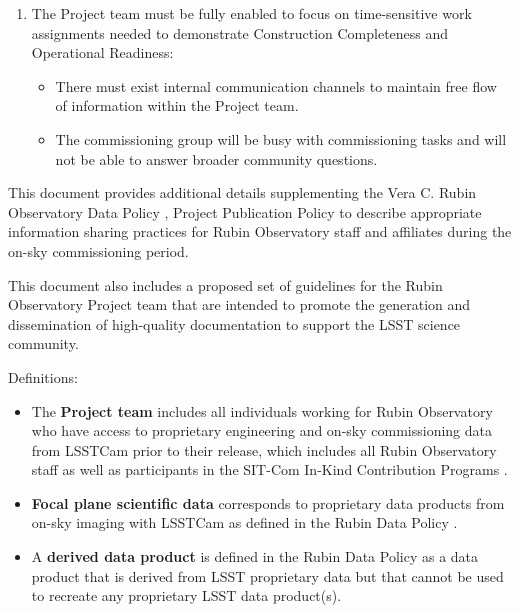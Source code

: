 \documentclass[SE,authoryear,toc,lsstdraft]{lsstdoc}
\begin{document}
\begin{enumerate}
  \item The Project team must be fully enabled to focus on time-sensitive work assignments needed to demonstrate Construction Completeness and Operational Readiness:

  \begin{itemize}

    \item There must exist internal communication channels to maintain free flow of information within the Project team.

    \item The commissioning group will be busy with commissioning tasks and will not be able to answer broader community questions.

  \end{itemize}

\end{enumerate}

This document provides additional details supplementing the Vera C. Rubin Observatory Data Policy , Project Publication Policy  to describe appropriate information sharing practices for Rubin Observatory staff and affiliates during the on-sky commissioning period.

This document also includes a proposed set of guidelines for the Rubin Observatory Project team that are intended to promote the generation and dissemination of high-quality documentation to support the LSST science community.

Definitions:

\begin{itemize}

  \item The \textbf{Project team} includes all individuals working for Rubin Observatory who have access to proprietary engineering and on-sky commissioning data from LSSTCam prior to their release, which includes all Rubin Observatory staff as well as participants in the SIT-Com In-Kind Contribution Programs .

  \item \textbf{Focal plane scientific data} corresponds to proprietary data products from on-sky imaging with LSSTCam as defined in the Rubin Data Policy .

  \item A \textbf{derived data product} is defined in the Rubin Data Policy  as a data product that is derived from LSST proprietary data but that cannot be used to recreate any proprietary LSST data product(s).


\end{itemize}
\end{document}
